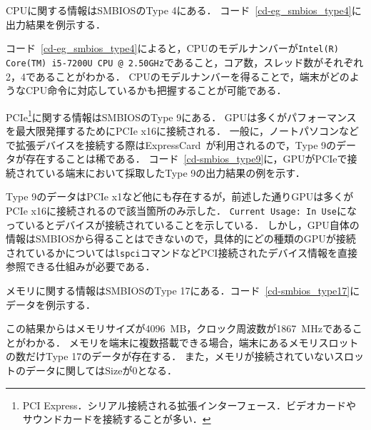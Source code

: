 CPUに関する情報はSMBIOSのType 4にある．
コード~\ref{cd-eg_smbios_type4}に出力結果を例示する．



コード~\ref{cd-eg_smbios_type4}によると，CPUのモデルナンバーが\texttt{Intel(R) Core(TM) i5-7200U CPU @ 2.50GHz}であること，コア数，スレッド数がそれぞれ2，4であることがわかる．
CPUのモデルナンバーを得ることで，端末がどのようなCPU命令に対応しているかも把握することが可能である．

PCIe\footnote{PCI Express．シリアル接続される拡張インターフェース．ビデオカードやサウンドカードを接続することが多い．}に関する情報はSMBIOSのType 9にある．
GPUは多くがパフォーマンスを最大限発揮するためにPCIe x16に接続される．
一般に，ノートパソコンなどで拡張デバイスを接続する際はExpressCard~\cite{express_card}が利用されるので，Type 9のデータが存在することは稀である．
コード~\ref{cd-smbios_type9}に，GPUがPCIeで接続されている端末において採取したType 9の出力結果の例を示す．



Type 9のデータはPCIe x1など他にも存在するが，前述した通りGPUは多くがPCIe x16に接続されるので該当箇所のみ示した．
\texttt{Current Usage: In Use}になっているとデバイスが接続されていることを示している．
しかし，GPU自体の情報はSMBIOSから得ることはできないので，具体的にどの種類のGPUが接続されているかについては\texttt{lspci}コマンドなどPCI接続されたデバイス情報を直接参照できる仕組みが必要である．

メモリに関する情報はSMBIOSのType 17にある．コード~\ref{cd-smbios_type17}にデータを例示する．



この結果からはメモリサイズが4096~MB，クロック周波数が1867~MHzであることがわかる．
メモリを端末に複数搭載できる場合，端末にあるメモリスロットの数だけType 17のデータが存在する．
また，メモリが接続されていないスロットのデータに関してはSizeが0となる．

